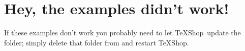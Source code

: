 \documentclass[11pt]{article}
\newcommand{\TS}{\textsf{\TeX Shop}}
\begin{document}
\section*{Hey, the examples didn't work!}

%

If these examples don't work you probably need to let \TS\ update the  folder; simply delete that folder from  and restart \TS.
\end{document}
